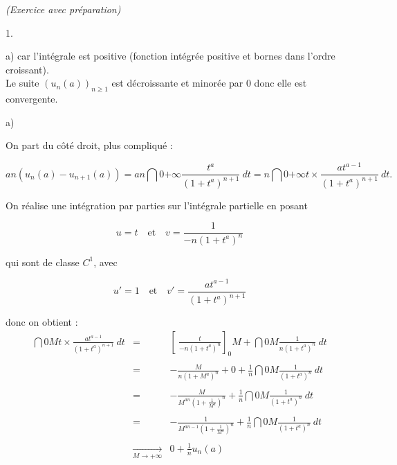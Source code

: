 \documentclass[11pt]{article}%
\begin{document}
\begin{exercice}{\it (Exercice avec préparation)}
\begin{noliste}{1.}
\begin{noliste}{a)}
 car l'intégrale est positive (fonction intégrée positive et bornes
dans l'ordre croissant). \\

 Le suite $(u_{n}(a))_{ n \geq 1 }$ est décroissante et minorée par 0
donc elle est convergente. \\

 \end{noliste}

 \item \begin{noliste}{a)}
 \setlength{\itemsep}{2mm}

 \item On part du côté droit, plus compliqué : 
 
\[
 a n ( u_{n} (a) - u_{n + 1} (a) ) = a n \dint{0}{+ \infty} \frac{
t^{a} }{ ( 1 + t^{a} )^{ n + 1 } } \ dt = n \dint{0}{+ \infty} t \times
\frac{ a t^{ a-1 } }{ ( 1 + t^{a} )^{ n + 1 } } \ dt. 
\]

 On réalise une intégration par parties sur l'intégrale partielle en
posant
 
\[
 u = t \ \ \ \text{ et } \ \ \ v = \frac{ 1 }{ - n ( 1 + t^{a} )^{n} } 
\]

 qui sont de classe $C^{1}$, avec
 
\[
 u' = 1 \ \ \ \text{ et } \ \ \ v' = \frac{ a t^{ a-1 } }{ ( 1 + t^{a}
)^{ n + 1 } } 
\]

 donc on obtient : 
 \begin{eqnarray*}
 \dint{0}{M} t \times \frac{ a t^{ a-1 } }{ ( 1 + t^{a} )^{ n + 1 } } \
dt & = & \left[ \ \frac{ t }{ - n ( 1 + t^{a} )^{n} } \right]_{0}{M} +
\dint{0}{M} \frac{ 1 }{ n ( 1 + t^{a} )^{n} } \ dt \\
\\
 & = & - \frac{ M }{ n ( 1 + M^{a} )^{n} } + 0 + \frac{1}{n}
\dint{0}{M} \frac{ 1 }{ ( 1 + t^{a} )^{n} } \ dt \\
\\
 & = & - \frac{ M }{ M^{ a n } \left( 1 + \frac{ 1 }{ M^{a} }
\right)^{n} } + \frac{1}{n} \dint{0}{M} \frac{ 1 }{ ( 1 + t^{a} )^{n} }
\ dt \\
\\
 & = & - \frac{ 1 }{ M^{ a n - 1 } \left( 1 + \frac{ 1 }{ M^{a} }
\right)^{n} } + \frac{1}{n} \dint{0}{M} \frac{ 1 }{ ( 1 + t^{a} )^{n} }
\ dt \\
\\
 & \xrightarrow[ M \rightarrow + \infty ]{} & 0 + \frac{ 1 }{ n } u_{n}
(a) \end{eqnarray*}


\end{noliste}
\end{noliste}
\end{exercice}
\end{document}
